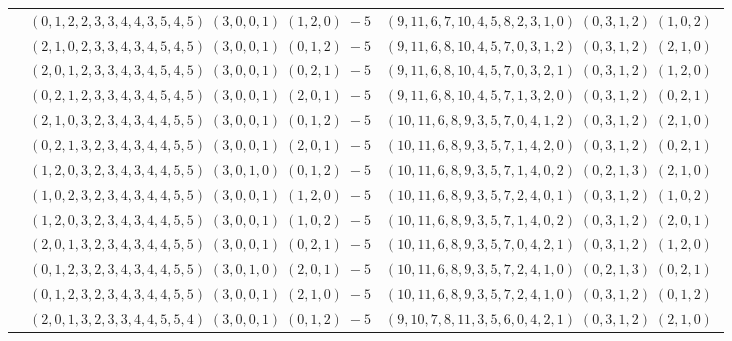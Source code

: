 \documentclass[11pt]{article}
\begin{document}
\begin{longtable}[l]{|c|c|c|}
 \cline{2-3} 
 & $(0 ,1 ,2 ,2 ,3 ,3 ,4 ,4 ,3 ,5 ,4 ,5) \;(3 ,0 ,0 ,1) \;(1 ,2 ,0) \;-5$ & $(9 ,11 ,6 ,7 ,10 ,4 ,5 ,8 ,2 ,3 ,1 ,0) \;(0 ,3 ,1 ,2) \;(1 ,0 ,2) \;$\\ 
 \cline{2-3} 
 & $(2 ,1 ,0 ,2 ,3 ,3 ,4 ,3 ,4 ,5 ,4 ,5) \;(3 ,0 ,0 ,1) \;(0 ,1 ,2) \;-5$ & $(9 ,11 ,6 ,8 ,10 ,4 ,5 ,7 ,0 ,3 ,1 ,2) \;(0 ,3 ,1 ,2) \;(2 ,1 ,0) \;$\\ 
 \cline{2-3} 
 & $(2 ,0 ,1 ,2 ,3 ,3 ,4 ,3 ,4 ,5 ,4 ,5) \;(3 ,0 ,0 ,1) \;(0 ,2 ,1) \;-5$ & $(9 ,11 ,6 ,8 ,10 ,4 ,5 ,7 ,0 ,3 ,2 ,1) \;(0 ,3 ,1 ,2) \;(1 ,2 ,0) \;$\\ 
 \cline{2-3} 
 & $(0 ,2 ,1 ,2 ,3 ,3 ,4 ,3 ,4 ,5 ,4 ,5) \;(3 ,0 ,0 ,1) \;(2 ,0 ,1) \;-5$ & $(9 ,11 ,6 ,8 ,10 ,4 ,5 ,7 ,1 ,3 ,2 ,0) \;(0 ,3 ,1 ,2) \;(0 ,2 ,1) \;$\\ 
 \cline{2-3} 
 & $(2 ,1 ,0 ,3 ,2 ,3 ,4 ,3 ,4 ,4 ,5 ,5) \;(3 ,0 ,0 ,1) \;(0 ,1 ,2) \;-5$ & $(10 ,11 ,6 ,8 ,9 ,3 ,5 ,7 ,0 ,4 ,1 ,2) \;(0 ,3 ,1 ,2) \;(2 ,1 ,0) \;$\\ 
 \cline{2-3} 
 & $(0 ,2 ,1 ,3 ,2 ,3 ,4 ,3 ,4 ,4 ,5 ,5) \;(3 ,0 ,0 ,1) \;(2 ,0 ,1) \;-5$ & $(10 ,11 ,6 ,8 ,9 ,3 ,5 ,7 ,1 ,4 ,2 ,0) \;(0 ,3 ,1 ,2) \;(0 ,2 ,1) \;$\\ 
 \cline{2-3} 
 & $(1 ,2 ,0 ,3 ,2 ,3 ,4 ,3 ,4 ,4 ,5 ,5) \;(3 ,0 ,1 ,0) \;(0 ,1 ,2) \;-5$ & $(10 ,11 ,6 ,8 ,9 ,3 ,5 ,7 ,1 ,4 ,0 ,2) \;(0 ,2 ,1 ,3) \;(2 ,1 ,0) \;$\\ 
 \cline{2-3} 
 & $(1 ,0 ,2 ,3 ,2 ,3 ,4 ,3 ,4 ,4 ,5 ,5) \;(3 ,0 ,0 ,1) \;(1 ,2 ,0) \;-5$ & $(10 ,11 ,6 ,8 ,9 ,3 ,5 ,7 ,2 ,4 ,0 ,1) \;(0 ,3 ,1 ,2) \;(1 ,0 ,2) \;$\\ 
 \cline{2-3} 
 & $(1 ,2 ,0 ,3 ,2 ,3 ,4 ,3 ,4 ,4 ,5 ,5) \;(3 ,0 ,0 ,1) \;(1 ,0 ,2) \;-5$ & $(10 ,11 ,6 ,8 ,9 ,3 ,5 ,7 ,1 ,4 ,0 ,2) \;(0 ,3 ,1 ,2) \;(2 ,0 ,1) \;$\\ 
 \cline{2-3} 
 & $(2 ,0 ,1 ,3 ,2 ,3 ,4 ,3 ,4 ,4 ,5 ,5) \;(3 ,0 ,0 ,1) \;(0 ,2 ,1) \;-5$ & $(10 ,11 ,6 ,8 ,9 ,3 ,5 ,7 ,0 ,4 ,2 ,1) \;(0 ,3 ,1 ,2) \;(1 ,2 ,0) \;$\\ 
 \cline{2-3} 
 & $(0 ,1 ,2 ,3 ,2 ,3 ,4 ,3 ,4 ,4 ,5 ,5) \;(3 ,0 ,1 ,0) \;(2 ,0 ,1) \;-5$ & $(10 ,11 ,6 ,8 ,9 ,3 ,5 ,7 ,2 ,4 ,1 ,0) \;(0 ,2 ,1 ,3) \;(0 ,2 ,1) \;$\\ 
 \cline{2-3} 
 & $(0 ,1 ,2 ,3 ,2 ,3 ,4 ,3 ,4 ,4 ,5 ,5) \;(3 ,0 ,0 ,1) \;(2 ,1 ,0) \;-5$ & $(10 ,11 ,6 ,8 ,9 ,3 ,5 ,7 ,2 ,4 ,1 ,0) \;(0 ,3 ,1 ,2) \;(0 ,1 ,2) \;$\\ 
 \cline{2-3} 
 & $(2 ,0 ,1 ,3 ,2 ,3 ,3 ,4 ,4 ,5 ,5 ,4) \;(3 ,0 ,0 ,1) \;(0 ,1 ,2) \;-5$ & $(9 ,10 ,7 ,8 ,11 ,3 ,5 ,6 ,0 ,4 ,2 ,1) \;(0 ,3 ,1 ,2) \;(2 ,1 ,0) \;$\\ 

\end{longtable}
\end{document}

